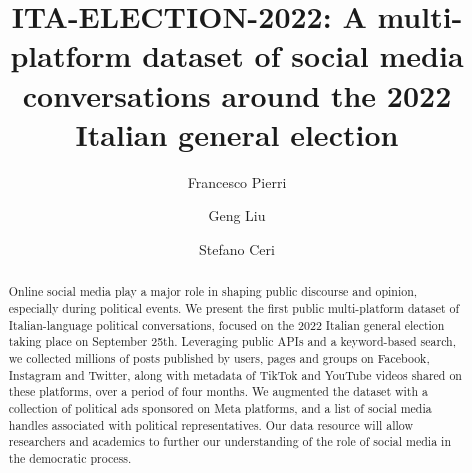 \documentclass[sigconf,screen]{acmart}
\begin{document}

\title{ITA-ELECTION-2022: A multi-platform dataset of social media\\ conversations around the 2022 Italian general election}



\author{Francesco Pierri}

\author{Geng Liu}

\author{Stefano Ceri}

\renewcommand{\shortauthors}{Pierri, Liu, and Ceri}
\begin{abstract}
Online social media play a major role in shaping public discourse and opinion, especially during political events.
We present the first public multi-platform dataset of Italian-language political conversations, focused on the 2022 Italian general election taking place on September 25th. Leveraging public APIs and a keyword-based search, we collected millions of posts published by users, pages and groups on Facebook, Instagram and Twitter, along with metadata of TikTok and YouTube videos shared on these platforms, over a period of four months. We augmented the dataset with a collection of political ads sponsored on Meta platforms, and a list of social media handles associated with political representatives. Our data resource will allow researchers and academics to further our understanding of the role of social media in the democratic process.
\end{abstract}
\end{document}
